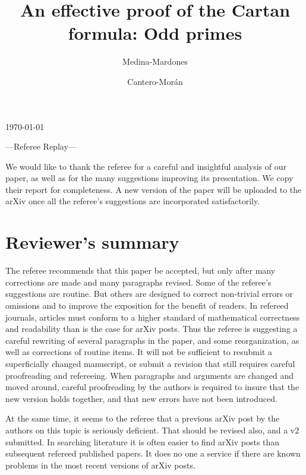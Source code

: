 \documentclass{amsart}
\title[Referee reply]{An effective proof of the Cartan formula: Odd primes}
\author{Medina-Mardones}
\author{Cantero-Mor\'an}
\begin{document}
\noindent\today

\begin{center}
	\Large{---Referee Replay---}
	\bigskip
\end{center}

\maketitle

We would like to thank the referee for a careful and insightful analysis of our paper, as well as for the many suggestions improving its presentation.
We copy their report for completeness.
A new version of the paper will be uploaded to the arXiv once all the referee's suggestions are incorporated satisfactorily.

\section{Reviewer's summary}

\noindent The referee recommends that this paper be accepted, but only after many corrections are made and many paragraphs revised. Some of the referee’s suggestions are routine.
But others are designed to correct non-trivial errors or omissions and to improve the exposition for the benefit of readers. In refereed journals, articles must conform to a higher standard of mathematical correctness and readability than is the case for arXiv posts.
Thus the referee is suggesting a careful rewriting of several paragraphs in the paper, and some reorganization, as well as corrections of routine items. It will not be sufficient to	resubmit a superficially changed manuscript, or submit a revision that still requires careful proofreading and refereeing. When paragraphs and arguments are changed and moved	around, careful proofreading by the authors is required to insure that the new version	holds together, and that new errors have not been introduced.

At the same time, it seems to the referee that a previous arXiv post by the authors on this	topic is seriously deficient.
That should be revised also, and a v2 submitted.
In searching literature it is often easier to find arXiv posts than subsequent refereed published papers.
It does no one a service if there are known problems in the most recent versions of arXiv posts.
\end{document}
